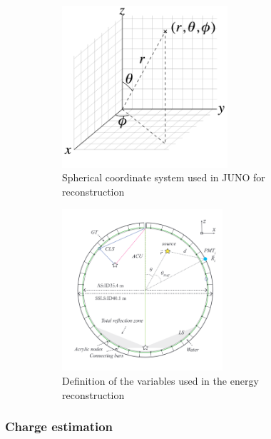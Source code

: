 \documentclass[../main.tex]{subfiles}
\begin{document}
\begin{figure}[ht]
  \begin{subfigure}[b]{0.48\linewidth}
    \centering
    \includegraphics[height=6cm]{images/juno/spherical_coordinate_system.png}
    \caption{Spherical coordinate system used in JUNO for reconstruction}
    \label{fig:juno:rec:corrdinate_system}
  \end{subfigure}
  \hfill
  \begin{subfigure}[b]{0.48\linewidth}
    \centering
    \includegraphics[height=6cm]{images/juno/reco/energy_reco_vars.png}
    \caption{Definition of the variables used in the energy reconstruction}
    \label{fig:juno:rec:energy_vars}
  \end{subfigure}
  \caption{}
\end{figure}

\subsubsection{Charge estimation}
\end{document}
